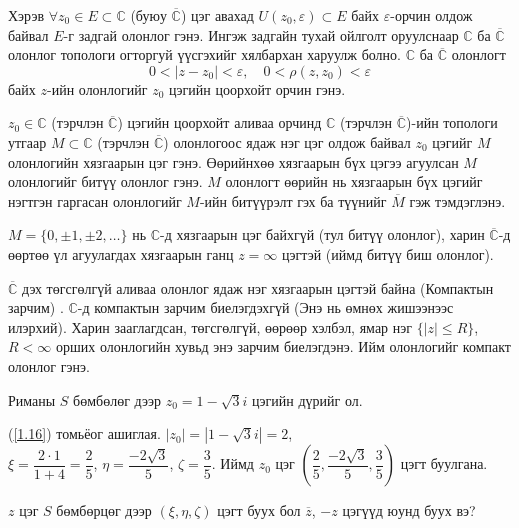 Хэрэв $\forall z_0\in E\subset \mathbb{C}$ (буюу $\overline{\mathbb{C}}$) цэг авахад $U(z_0,\varepsilon)\subset E$ байх $\varepsilon$-орчин олдож байвал $E$-г задгай олонлог гэнэ. Ингэж задгайн тухай ойлголт оруулснаар $\mathbb{C}$ ба $\overline{\mathbb{C}}$ олонлог топологи огторгуй үүсгэхийг хялбархан харуулж болно. $\mathbb{C}$ ба $\overline{\mathbb{C}}$ олонлогт 
\begin{equation}
0<|z-z_0|<\varepsilon , \quad 0<\rho (z,z_0)<\varepsilon
\end{equation}
байх $z$-ийн олонлогийг $z_0$ цэгийн цоорхойт орчин  гэнэ.
\begin{dfn}
$z_0\in\mathbb{C}$  (тэрчлэн $\overline{\mathbb{C}}$) цэгийн цоорхойт аливаа орчинд $\mathbb{C}$  (тэрчлэн $\overline{\mathbb{C}}$)-ийн топологи утгаар $M\subset \mathbb{C}$ (тэрчлэн $\overline{\mathbb{C}}$) олонлогоос ядаж нэг цэг олдож байвал $z_0$ цэгийг $M$ олонлогийн хязгаарын цэг гэнэ. Өөрийнхөө хязгаарын бүх цэгээ агуулсан $M$ олонлогийг битүү олонлог  гэнэ. $M$ олонлогт өөрийн нь хязгаарын бүх цэгийг нэгтгэн гаргасан олонлогийг $M$-ийн битүүрэлт гэх ба түүнийг $\overline{M}$ гэж тэмдэглэнэ. 
\end{dfn}
\begin{exm}
$M=\{0,\pm 1,\pm 2,\ldots \}$ нь $\mathbb{C}$-д хязгаарын цэг байхгүй (тул битүү олонлог), харин $\overline{\mathbb{C}}$-д өөртөө үл агуулагдах хязгаарын ганц $z=\infty$ цэгтэй (иймд битүү биш олонлог).

$\overline{\mathbb{C}}$ дэх төгсгөлгүй аливаа олонлог ядаж нэг хязгаарын цэгтэй байна (Компактын зарчим) . $\mathbb{C}$-д компактын зарчим биелэгдэхгүй (Энэ нь өмнөх жишээнээс илэрхий). Харин зааглагдсан, төгсгөлгүй, өөрөөр хэлбэл, ямар нэг $\{|z|\leq R\}$, $R<\infty$ орших олонлогийн хувьд энэ зарчим биелэгдэнэ. Ийм олонлогийг компакт олонлог гэнэ.
\end{exm}
\begin{exm}
Риманы $S$ бөмбөлөг дээр $z_0=1-\sqrt{3}i$ цэгийн дүрийг ол.
\end{exm}
\begin{sol}
(\ref{1.16}) томьёог ашиглая. $|z_0|=|1-\sqrt{3}i|=2$, \\ $\xi =\dfrac{2\cdot 1}{1+4}=\dfrac{2}{5}$, $\eta =\dfrac{-2\sqrt{3}}{5}$, $\zeta =\dfrac{3}{5}$. Иймд $z_0$ цэг $\left(\dfrac{2}{5}, \dfrac{-2\sqrt{3}}{5}, \dfrac{3}{5}\right)$ цэгт буулгана.
\end{sol}
\begin{exm}
$z$ цэг $S$ бөмбөрцөг дээр $(\xi, \eta,\zeta)$ цэгт буух бол $\overline{z}$, $-z$ цэгүүд юунд буух вэ?
\end{exm}
